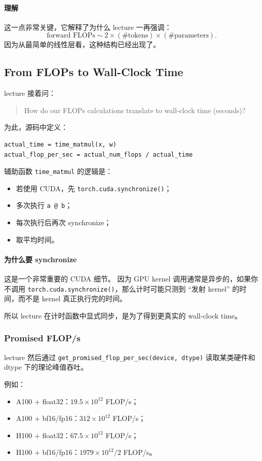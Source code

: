\documentclass[a4paper,UTF8]{article}
\numberwithin{equation}{section}
\begin{document}
\paragraph{理解}
这一点非常关键，它解释了为什么 lecture 一再强调：
\[
\text{forward FLOPs} \sim 2 \times (\#\text{tokens}) \times (\#\text{parameters}).
\]
因为从最简单的线性层看，这种结构已经出现了。

\subsection{From FLOPs to Wall-Clock Time}

lecture 接着问：
\begin{quote}
How do our FLOPs calculations translate to wall-clock time (seconds)?
\end{quote}

为此，源码中定义：
\begin{verbatim}
actual_time = time_matmul(x, w)
actual_flop_per_sec = actual_num_flops / actual_time
\end{verbatim}

辅助函数 \verb|time_matmul| 的逻辑是：
\begin{itemize}
    \item 若使用 CUDA，先 \verb|torch.cuda.synchronize()|；
    \item 多次执行 \verb|a @ b|；
    \item 每次执行后再次 synchronize；
    \item 取平均时间。
\end{itemize}

\paragraph{为什么要 synchronize}
这是一个非常重要的 CUDA 细节。  
因为 GPU kernel 调用通常是异步的，如果你不调用 \verb|torch.cuda.synchronize()|，那么计时可能只测到 ``发射 kernel'' 的时间，而不是 kernel 真正执行完的时间。

所以 lecture 在计时函数中显式同步，是为了得到更真实的 wall-clock time。

\subsubsection{Promised FLOP/s}

lecture 然后通过 \verb|get_promised_flop_per_sec(device, dtype)| 读取某类硬件和 dtype 下的理论峰值吞吐。

例如：
\begin{itemize}
    \item A100 + float32：\(19.5 \times 10^{12}\) FLOP/s；
    \item A100 + bf16/fp16：\(312 \times 10^{12}\) FLOP/s；
    \item H100 + float32：\(67.5 \times 10^{12}\) FLOP/s；
    \item H100 + bf16/fp16：\(1979 \times 10^{12}/2\) FLOP/s。
\end{itemize}
\end{document}
